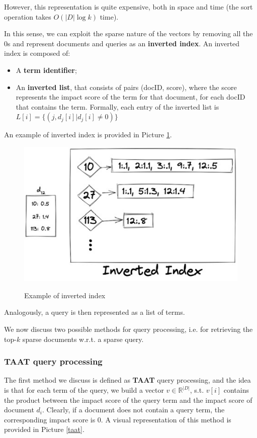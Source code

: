 However, this representation is quite expensive, both in space and time (the sort operation takes $O(|D| \log k)$ time).

In this sense, we can exploit the sparse nature of the vectors by removing all the 0s and represent documents and queries as an \textbf{inverted index}. An inverted index is composed of:

\begin{itemize}
    \item A \textbf{term identifier};
    \item An \textbf{inverted list}, that consists of pairs (docID, score), where the score represents the impact score of the term for that document, for each docID that contains the term. Formally, each entry of the inverted list is $L[i] = \{ (j, d_j[i] | d_j[i] \neq 0) \}$
\end{itemize}

An example of inverted index is provided in Picture \ref{inv ind}.

\begin{figure}[h!]
		\centering
		\includegraphics[scale = 1.8]{img/inverted index.jpg}
        \label{inv ind}
        \caption{Example of inverted index}
\end{figure}

Analogously, a query is then represented as a list of terms.

We now discuss two possible methods for query processing, i.e. for retrieving the top-$k$ sparse documents w.r.t. a sparse query.

\subsubsection{TAAT query processing}
The first method we discuss is defined as \textbf{TAAT} query processing, and the idea is that for each term of the query, we build a vector $v \in \mathbb{R}^{|D|}$, s.t. $v[i]$ contains the product between the impact score of the query term and the impact score of document $d_i$. Clearly, if a document does not contain a query term, the corresponding impact score is 0. A visual representation of this method is provided in Picture \ref{taat}.

